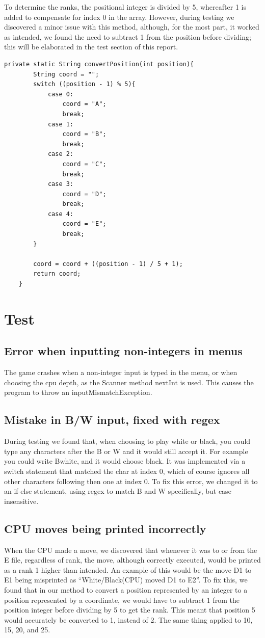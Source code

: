 \documentclass[12pt, a4paper]{article}
\begin{document}
	To determine the ranks, the positional integer is divided by 5, whereafter 1 is added to compensate for index 0 in the array.
	However, during testing we discovered a minor issue with this method, although, for the most part, it worked as intended, we found the need to subtract 1 from the position before dividing; this will be elaborated in the test section of this report.
	
	\begin{lstlisting}[style=JavaStyle]
    private static String convertPosition(int position){
		String coord = "";
		switch ((position - 1) % 5){
			case 0:
				coord = "A";
				break;
			case 1:
				coord = "B";
				break;
			case 2:
				coord = "C";
				break;
			case 3:
				coord = "D";
				break;
			case 4:
				coord = "E";
				break;
		}
		
		coord = coord + ((position - 1) / 5 + 1);
		return coord;
	}
	\end{lstlisting}
	\vspace{10mm}
	\section{Test}

	\subsection{Error when inputting non-integers in menus}
	The game crashes when a non-integer input is typed in the menu, or when choosing the cpu depth, as the Scanner method nextInt is used. This causes the program to throw an inputMismatchException.
	
	\subsection{Mistake in B/W input, fixed with regex}
	During testing we found that, when choosing to play white or black, you could type any characters after the B or W and it would still accept it. For example you could write Bwhite, and it would choose black. It was implemented via a switch statement that matched the char at index 0, which of course ignores all other characters following then one at index 0.
	To fix this error, we changed it to an if-else statement, using regex to match B and W specifically, but case insensitive.
	
	\subsection{CPU moves being printed incorrectly}
	When the CPU made a move, we discovered that whenever it was to or from the E file, regardless of rank, the move, although correctly executed, would be printed as a rank 1 higher than intended. An example of this would be the move D1 to E1 being misprinted as “White/Black(CPU) moved D1 to E2”. To fix this, we found that in our method to convert a position represented by an integer to a position represented by a coordinate, we would have to subtract 1 from the position integer before dividing by 5 to get the rank. This meant that position 5 would accurately be converted to 1, instead of 2. The same thing applied to 10, 15, 20, and 25.
	
\end{document}
